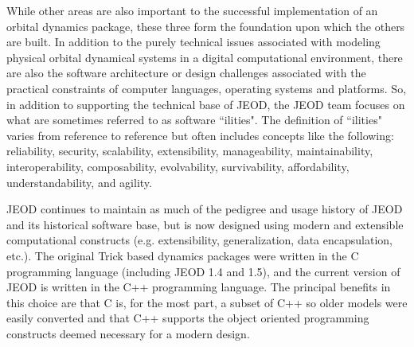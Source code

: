While other areas are also important to the successful implementation of an orbital dynamics package, these three form the foundation upon which the others are built.  In addition to the purely technical issues associated with modeling physical orbital dynamical systems in a digital computational environment, there are also the software architecture or design challenges associated with the practical constraints of computer languages, operating systems and platforms.  So, in addition to supporting the technical base of JEOD, the JEOD team focuses on what are sometimes referred to as software ``ilities".  The definition of ``ilities" varies from reference to reference but often includes concepts like the following: reliability, security, scalability, extensibility, manageability, maintainability, interoperability, composability, evolvability, survivability, affordability, understandability, and agility.

JEOD continues to maintain as much of the pedigree and usage history of JEOD and its historical software base, but is now designed using modern and extensible computational constructs (e.g. extensibility, generalization, data encapsulation, etc.).  The original Trick based dynamics packages were written in the C programming language (including JEOD 1.4 and 1.5), and the current version of JEOD is written in the C++ programming language.  The principal benefits in this choice are that C is, for the most part, a subset of C++ so older models were easily converted and that C++ supports the object oriented programming constructs deemed necessary for a modern design.

